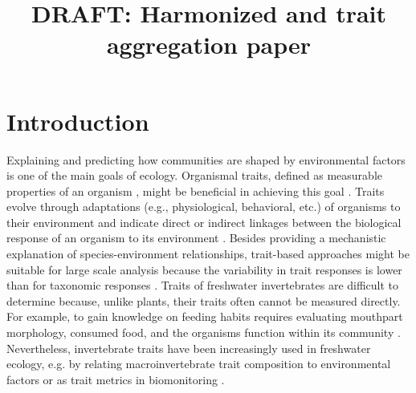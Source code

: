 \documentclass{article}
\title{DRAFT: Harmonized and trait aggregation paper }
\author{}%
\date{}
\begin{document}
\maketitle

\section*{Introduction}

Explaining and predicting how communities are shaped by environmental factors is one of the main goals of ecology. Organismal traits, defined as measurable properties of an organism \cite{mcgill_rebuilding_2006}, might be beneficial in achieving this goal \cite{heino_jani_macroecological_2013}. Traits evolve through adaptations (e.g., physiological, behavioral, etc.) of organisms to their environment and indicate direct or indirect linkages between the biological response of an organism to its environment \cite{southwood_habitat_1977, verberk_delivering_2013}. Besides providing a mechanistic explanation of species-environment relationships, trait-based approaches might be suitable for large scale analysis because the variability in trait responses is lower than for taxonomic responses \cite{bonada_taxonomic_2007, baird_toward_2011}. Traits of freshwater invertebrates are difficult to determine because, unlike plants, their traits often cannot be measured directly. For example, to gain knowledge on feeding habits requires evaluating mouthpart morphology, consumed food, and the organisms function within its community \cite{moog_comprehensive_nodate}. Nevertheless, invertebrate traits have been increasingly used in freshwater ecology, e.g. by relating macroinvertebrate trait composition to environmental factors or as trait metrics in biomonitoring \cite{poff_developing_2010, szocs_effects_2014, bhowmik_large_2015, menezes_beyond_2010}.

\end{document}
